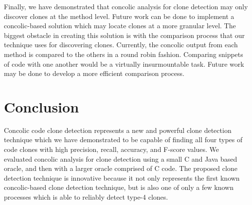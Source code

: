\documentclass{sig-alternate}
\begin{document}
Finally, we have demonstrated that concolic analysis for clone detection may only discover clones at the method level. Future work can be done to implement a concolic-based solution which may locate clones at a more granular level. The biggest obstacle in creating this solution is with the comparison process that our technique uses for discovering clones. Currently, the concolic output from each method is compared to the others in a round robin fashion. Comparing snippets of code with one another would be a virtually insurmountable task. Future work may be done to develop a more efficient comparison process.


\section{Conclusion}
\label{sec: conclusion}



Concolic code clone detection represents a new and powerful clone detection technique which we have demonstrated to be capable of finding all four types of code clones with high precision, recall, accuracy, and F-score values. We evaluated concolic analysis for clone detection using a small C and Java based oracle, and then with a larger oracle comprised of C code. The proposed clone detection technique is innovative because it not only represents the first known concolic-based clone detection technique, but is also one of only a few known processes which is able to reliably detect type-4 clones.


\balance


\balancecolumns
\end{document}
